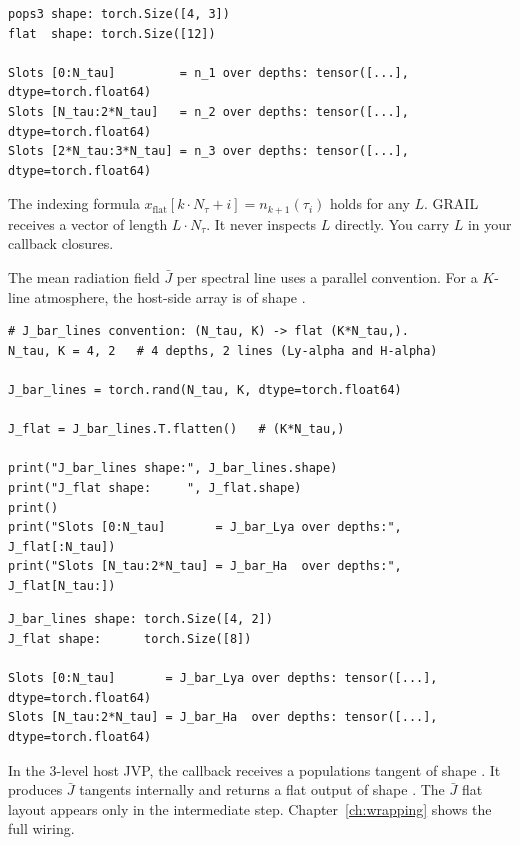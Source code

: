 \begin{lstlisting}[style=grailOutStyle]
pops3 shape: torch.Size([4, 3])
flat  shape: torch.Size([12])

Slots [0:N_tau]         = n_1 over depths: tensor([...], dtype=torch.float64)
Slots [N_tau:2*N_tau]   = n_2 over depths: tensor([...], dtype=torch.float64)
Slots [2*N_tau:3*N_tau] = n_3 over depths: tensor([...], dtype=torch.float64)
\end{lstlisting}

The indexing formula $x_\text{flat}[k \cdot N_\tau + i] = n_{k+1}(\tau_i)$
holds for any $L$.
GRAIL receives a vector of length $L \cdot N_\tau$.
It never inspects $L$ directly.
You carry $L$ in your callback closures.

The mean radiation field $\bar J$ per spectral line uses a parallel
convention.
For a $K$-line atmosphere, the host-side array is  of
shape .

\begin{lstlisting}[style=grailInStyle]
# J_bar_lines convention: (N_tau, K) -> flat (K*N_tau,).
N_tau, K = 4, 2   # 4 depths, 2 lines (Ly-alpha and H-alpha)

J_bar_lines = torch.rand(N_tau, K, dtype=torch.float64)

J_flat = J_bar_lines.T.flatten()   # (K*N_tau,)

print("J_bar_lines shape:", J_bar_lines.shape)
print("J_flat shape:     ", J_flat.shape)
print()
print("Slots [0:N_tau]       = J_bar_Lya over depths:", J_flat[:N_tau])
print("Slots [N_tau:2*N_tau] = J_bar_Ha  over depths:", J_flat[N_tau:])
\end{lstlisting}

\begin{lstlisting}[style=grailOutStyle]
J_bar_lines shape: torch.Size([4, 2])
J_flat shape:      torch.Size([8])

Slots [0:N_tau]       = J_bar_Lya over depths: tensor([...], dtype=torch.float64)
Slots [N_tau:2*N_tau] = J_bar_Ha  over depths: tensor([...], dtype=torch.float64)
\end{lstlisting}


In the 3-level host JVP, the callback receives a populations tangent of
shape .
It produces $\bar J$ tangents internally and returns a flat output of shape
.
The $\bar J$ flat layout appears only in the intermediate step.
Chapter~\ref{ch:wrapping} shows the full wiring.

